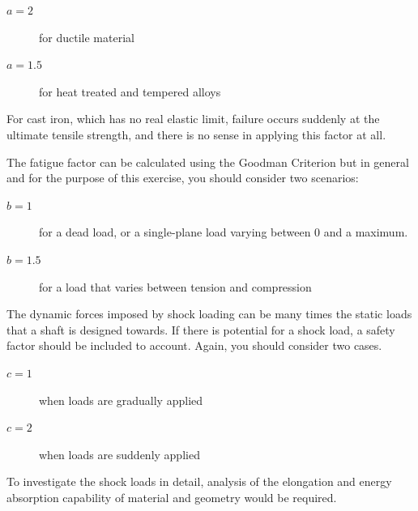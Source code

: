\begin{description}
  \item[\(a=2\)] for ductile material
  \item[\(a=1.5\)] for heat treated and tempered alloys
\end{description}

For cast iron, which has no real elastic limit, failure occurs suddenly at the ultimate tensile strength, and there is no sense in applying this factor at all.

The fatigue factor can be calculated using the Goodman Criterion but in general and for the purpose of this exercise, you should consider two scenarios:




\begin{description}
  \item[\(b=1\)] for a dead load, or a single-plane load varying between 0 and a maximum.
  \item[\(b=1.5\)] for a load that varies between tension and compression
\end{description}

The dynamic forces imposed by shock loading can be many times the static loads that a shaft is designed towards. If there is potential for a shock load, a safety factor should be included to account. Again, you should consider two cases.

\begin{description}
  \item[\(c=1\)] when loads are gradually applied
  \item[\(c=2\)] when loads are suddenly applied
\end{description}

To investigate the shock loads in detail, analysis of the elongation and energy absorption capability of material and geometry would be required.

